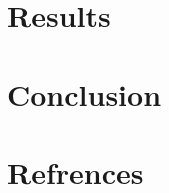 \documentclass[english,notitlepage,reprint,nofootinbib]{revtex4-2}  %
\begin{document}
	
	
	
	\section{Results}\label{sec:results}
	
	
		
	\section{Conclusion}\label{sec:conclusion}
	
	
	
	
	\onecolumngrid
	\section*{Refrences}
	
	
	
\end{document}
